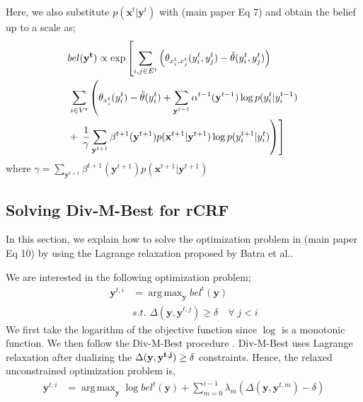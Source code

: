 \documentclass[conference]{IEEEtran}
\newcommand{\argmax}{\operatorname{arg\,max}}
\begin{document}
Here, we also substitute $p(\mathbf{x}^t|\mathbf{y}^t)$ with (main paper Eq 7) and obtain the belief up to a scale as;
\begin{equation}\small
  \begin{aligned}
&bel(\mathbf{y^t}) \propto \exp\left[  \sum_{i,j \in E^t} \left( \theta_{x^t_i,x^t_j}(y^t_i,y^t_j) - \tilde{\theta}(y^t_i,y^t_j) \right) \right. \\
&\left. \sum_{i \in V^t} \left( \theta_{x^t_i}(y^t_i) - \tilde{\theta}(y^t_i) +  \sum_{\mathbf{y}^{t-1}} \alpha^{t-1}(\mathbf{y}^{t-1}) \log p(y^t_i|y^{t-1}_i) \right. \right. \\
&+\left.\left.\frac{1}{\gamma}\sum_{\mathbf{y}^{t+1}} \beta^{t+1}(\mathbf{y}^{t+1}) p(\mathbf{x}^{t+1}|\mathbf{y}^{t+1}) \log p(y^{t+1}_i|y^{t}_i) \right) \right]
\end{aligned}
\label{crfbelief}
\end{equation}
where $\gamma=\sum_{\mathbf{y}^{t+1}} \beta^{t+1}(\mathbf{y}^{t+1}) p(\mathbf{x}^{t+1}|\mathbf{y}^{t+1})$
\subsection{Solving Div-M-Best for rCRF}
In this section, we explain how to solve the optimization problem in (main paper Eq 10) by using the Lagrange relaxation proposed by Batra et al.\cite{divmbest}.

We are interested in the following optimization problem;
\begin{equation}
\begin{aligned}
\mathbf{y}^{t,i} &= \argmax_{\mathbf{y}}  bel^t(\mathbf{y}) \\
&s.t.\,\, \Delta(\mathbf{y},\mathbf{y}^{t,j}) \geq \delta \quad \forall \; {j < i}
\end{aligned}
\label{divopt}
\end{equation}
We first take the logarithm of the objective function since $\log$ is a monotonic function. We then follow the Div-M-Best procedure \cite{divmbest}. Div-M-Best uses Lagrange relaxation after dualizing the $\Delta(\bf{y},\bf{y}^{t,j}) \geq \delta$ constraints. Hence, the relaxed unconstrained optimization problem is,
\begin{equation}
\begin{aligned}
\mathbf{y}^{t,i} &= \argmax_{\mathbf{y}}  \log bel^t(\mathbf{y}) + \sum_{m=0}^{i-1} \lambda_m (\Delta(\mathbf{y},\mathbf{y}^{t,m}) - \delta)
\end{aligned}
\label{divoptL}
\end{equation}
\end{document}
